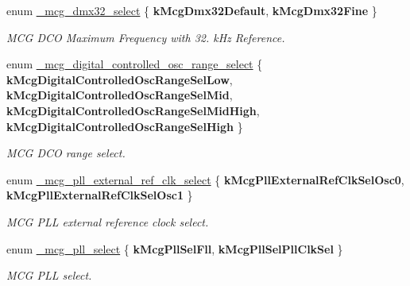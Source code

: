 \begin{DoxyCompactItemize}
\item 
enum \hyperlink{group__mcg__hal_ga2dc2623d99d177b249a01939ca247bb0}{\+\_\+mcg\+\_\+dmx32\+\_\+select} \{ {\bfseries k\+Mcg\+Dmx32\+Default}, 
{\bfseries k\+Mcg\+Dmx32\+Fine}
 \}\hypertarget{group__mcg__hal_ga2dc2623d99d177b249a01939ca247bb0}{}\label{group__mcg__hal_ga2dc2623d99d177b249a01939ca247bb0}
\begin{DoxyCompactList}\small\item\em M\+CG D\+CO Maximum Frequency with 32. k\+Hz Reference. \end{DoxyCompactList}
\item 
enum \hyperlink{group__mcg__hal_ga544033cb68fa530bfdb008c4ba7f7e79}{\+\_\+mcg\+\_\+digital\+\_\+controlled\+\_\+osc\+\_\+range\+\_\+select} \{ {\bfseries k\+Mcg\+Digital\+Controlled\+Osc\+Range\+Sel\+Low}, 
{\bfseries k\+Mcg\+Digital\+Controlled\+Osc\+Range\+Sel\+Mid}, 
{\bfseries k\+Mcg\+Digital\+Controlled\+Osc\+Range\+Sel\+Mid\+High}, 
{\bfseries k\+Mcg\+Digital\+Controlled\+Osc\+Range\+Sel\+High}
 \}\hypertarget{group__mcg__hal_ga544033cb68fa530bfdb008c4ba7f7e79}{}\label{group__mcg__hal_ga544033cb68fa530bfdb008c4ba7f7e79}
\begin{DoxyCompactList}\small\item\em M\+CG D\+CO range select. \end{DoxyCompactList}
\item 
enum \hyperlink{group__mcg__hal_ga5e604e4ad82258e69fe4b9f52c6342d0}{\+\_\+mcg\+\_\+pll\+\_\+external\+\_\+ref\+\_\+clk\+\_\+select} \{ {\bfseries k\+Mcg\+Pll\+External\+Ref\+Clk\+Sel\+Osc0}, 
{\bfseries k\+Mcg\+Pll\+External\+Ref\+Clk\+Sel\+Osc1}
 \}\hypertarget{group__mcg__hal_ga5e604e4ad82258e69fe4b9f52c6342d0}{}\label{group__mcg__hal_ga5e604e4ad82258e69fe4b9f52c6342d0}
\begin{DoxyCompactList}\small\item\em M\+CG P\+LL external reference clock select. \end{DoxyCompactList}
\item 
enum \hyperlink{group__mcg__hal_ga23a20e376b46abb54b99f388eca5fc3f}{\+\_\+mcg\+\_\+pll\+\_\+select} \{ {\bfseries k\+Mcg\+Pll\+Sel\+Fll}, 
{\bfseries k\+Mcg\+Pll\+Sel\+Pll\+Clk\+Sel}
 \}\hypertarget{group__mcg__hal_ga23a20e376b46abb54b99f388eca5fc3f}{}\label{group__mcg__hal_ga23a20e376b46abb54b99f388eca5fc3f}
\begin{DoxyCompactList}\small\item\em M\+CG P\+LL select. \end{DoxyCompactList}
\item 

\end{DoxyCompactItemize}
